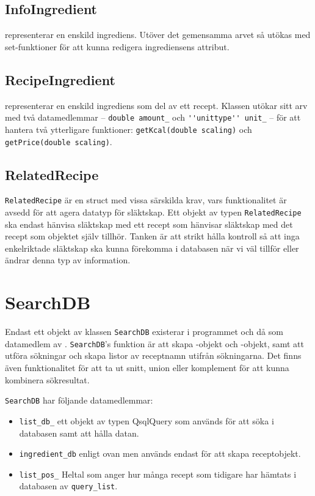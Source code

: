 \subsection{InfoIngredient}
\InfoIngredient{} representerar en enskild ingrediens. Utöver det gemensamma arvet så utökas \InfoIngredient{} med set-funktioner för att kunna redigera ingrediensens attribut.

\subsection{RecipeIngredient}
\RecipeIngredient{} representerar en enskild ingrediens som del av ett recept. Klassen utökar sitt arv med två datamedlemmar -- \verb=double amount_= och \verb=''unittype'' unit_= -- för att hantera två ytterligare funktioner: \verb+getKcal(double scaling)+ och \verb+getPrice(double scaling)+.
 
\subsection{RelatedRecipe}
\verb+RelatedRecipe+ är en struct med vissa särskilda krav, vars funktionalitet är avsedd för att agera datatyp för släktskap. Ett objekt av typen \verb+RelatedRecipe+ ska endast hänvisa släktskap med ett recept som hänvisar släktskap med det recept som objektet själv tillhör. Tanken är att strikt hålla kontroll så att inga enkelriktade släktskap ska kunna förekomma i databasen när vi väl tillför eller ändrar denna typ av information.



\section{SearchDB}
Endast ett objekt av klassen \verb+SearchDB+ existerar i programmet och då som
datamedlem av \Shell. \verb+SearchDB+'s funktion är att skapa \Recipe-objekt
och \InfoIngredient-objekt, samt att utföra sökningar och skapa listor av
receptnamn utifrån sökningarna. Det finns även funktionalitet för att ta ut
snitt, union eller komplement för att kunna kombinera sökresultat.

\verb+SearchDB+ har följande datamedlemmar:
  \begin{itemize}
    \item \verb+list_db_+ ett objekt av typen QsqlQuery som används för att söka
      i databasen samt att hålla datan.
    \item \verb+ingredient_db+ enligt ovan men används endast för att skapa
      receptobjekt.
    \item \verb+list_pos_+ Heltal som anger hur många recept som tidigare har
      hämtats i databasen av \verb+query_list+.
  \end{itemize}

